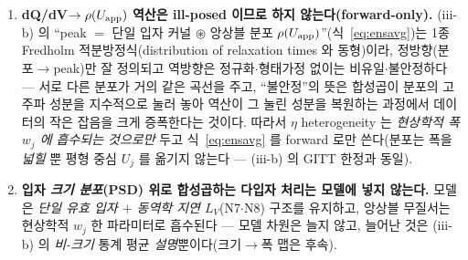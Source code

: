 \begin{enumerate}[label=(\roman*),leftmargin=2.2em,itemsep=2.5pt]
\emph{산포} $\delta U_\mathrm{PSD}$ 인데, 이는 실측 폭 $w\sim RT/F\approx25.7$ mV 의 $1\%$ 미만이고,
이동 절대값 기준으로도 상한 $\gamma$$\cdot$최소 $r$ 에서 $3\%$ 를 넘지 못한다. tier C 상정의 견고성을
명시하면 --- $\Delta U\propto\gamma$ 라 상한을 다시 $5$ 배 과대 상정해도($\gamma=5$ J/m$^2$)
$\delta U_\mathrm{PSD}\approx1.0$ mV 로 결론(실측 폭 대비 수 \% 미만)은 불변이다. \emph{동역학 채널}:
흑연의 GITT 실측 확산계수 $D\approx10^{-11}$--$4\times10^{-10}$ cm$^2$/s\cite{park2021} 로 평형화
시간은 $\tau(5\,\mu\mathrm m)=r^2/D\approx6\times10^{2}$--$2.5\times10^{4}$ s 규모이나, 이
$\tau\propto r^2$ 분산은 $|I|\to0$ 평형 기준선에서 항등적으로 소멸하며(지연은 유한 전류의 산물,
\S\ref{sec:lag}), 유한 전류에서는 전이당 단일 유효 $L_V$(N7)의 입자별 산포로 들어오는 이차
보정 --- 이미 부차적인 꼬리 폭의 산포 --- 에 그친다. 따라서 마이크론 흑연에서 반경$\to$곡선 사상은 두 채널
모두 정량적으로 작고, 일반형~\eqref{eq:psdconv} 의 반경 의존이 커널에서 소거되어 PSD 적분은 항등이
되며, 앙상블에 남는 heterogeneity 는 비-크기 $\eta$ 산포 --- 곧 식~\eqref{eq:ensavg} --- 뿐이다.
(iii-b) 의 $\rho(U_\app)$ 를 \emph{비-크기} heterogeneity 전용으로
두는 것은 선언이 아니라 이 수치 유도의 따름 결과다. 크기 채널이 유의해지는 것은 $1/r$ 이 큰 나노
영역(상한 $\gamma$ 기준 $r\approx30$ nm 에서 $\Delta U\approx25$ mV; $\gamma\sim0.1$ 이면 그
십분의 일)뿐이며, 그 영역(과 양자가둠 밴드 shift 류)은 본 장의
범위에 포함하지 않는다. Dahn 등의 $x_{\max}=1-P$ 무질서
모델\cite{dahn1995}은 비-크기 구조 무질서가 실재함을 보이는 \emph{용량-한계 예시}일 뿐, inter-particle
$\eta$ 분포 형상을 정량하는 1차 근거는 아니다(분포 형상 tier C 근거미발견 --- intra-particle site-blocking
식을 과대인용하지 않는다).
\item \textbf{dQ/dV$\to\rho(U_{\mathrm{app}})$ 역산은 ill-posed 이므로 하지 않는다(forward-only).} (iii-b) 의 ``peak $=$
단일 입자 커널 $\circledast$ 앙상블 분포 $\rho(U_\app)$''(식~\eqref{eq:ensavg})는 1종 Fredholm 적분방정식(distribution
of relaxation times 와 동형)이라, 정방향(분포$\to$peak)만 잘 정의되고 역방향은 정규화$\cdot$형태가정 없이는
비유일$\cdot$불안정하다 --- 서로 다른 분포가 거의 같은 곡선을 주고, ``불안정''의 뜻은 합성곱이 분포의
고주파 성분을 지수적으로 눌러 놓아 역산이 그 눌린 성분을 복원하는 과정에서 데이터의 작은 잡음을 크게
증폭한다는 것이다. 따라서 $\eta$ heterogeneity 는
\emph{현상학적 폭 $w_j$ 에 흡수되는 것으로만} 두고 식~\eqref{eq:ensavg} 를 forward 로만 쓴다(분포는 폭을
\emph{넓힐} 뿐 평형 중심 $U_j$ 를 옮기지 않는다 --- (iii-b) 의 GITT 한정과 동일\cite{park2021}).
\item \textbf{입자 \emph{크기 분포}(PSD) 위로 합성곱하는 다입자 처리는 모델에 넣지 않는다.} 모델은
\emph{단일 유효 입자 $+$ 동역학 지연 $L_V$}(N7$\cdot$N8) 구조를 유지하고, 앙상블 무질서는
현상학적 $w_j$ 한 파라미터로 흡수된다 --- 모델 차원은 늘지 않고, 늘어난 것은 (iii-b) 의 \emph{비-크기} 통계
평균 \emph{설명}뿐이다(크기$\to$폭 맵은 후속).
\end{enumerate}

